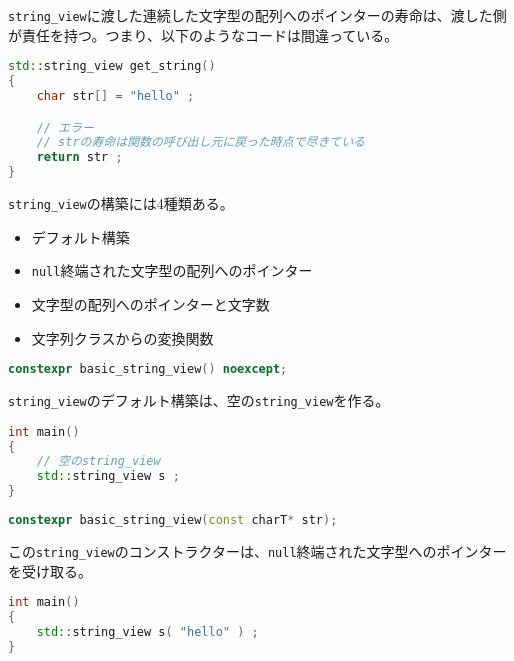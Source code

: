 \lstinline!string_view!に渡した連続した文字型の配列へのポインターの寿命は、渡した側が責任を持つ。つまり、以下のようなコードは間違っている。

\begin{lstlisting}[language=C++]
std::string_view get_string()
{
    char str[] = "hello" ;

    // エラー
    // strの寿命は関数の呼び出し元に戻った時点で尽きている
    return str ;
}
\end{lstlisting}

%

\lstinline!string_view!の構築には4種類ある。

\begin{itemize}
\itemsep1pt\parskip0pt
\item
  デフォルト構築
\item
  \lstinline!null!終端された文字型の配列へのポインター
\item
  文字型の配列へのポインターと文字数
\item
  文字列クラスからの変換関数
\end{itemize}

%

\bgroup
\begin{lstlisting}[language=C++]
constexpr basic_string_view() noexcept;
\end{lstlisting}
\egroup

\lstinline!string_view!のデフォルト構築は、空の\lstinline!string_view!を作る。

\begin{lstlisting}[language=C++]
int main()
{
    // 空のstring_view
    std::string_view s ;
}
\end{lstlisting}

%

\bgroup
\begin{lstlisting}[language=C++]
constexpr basic_string_view(const charT* str);
\end{lstlisting}
\egroup

この\lstinline!string_view!のコンストラクターは、\lstinline!null!終端された文字型へのポインターを受け取る。

\begin{lstlisting}[language=C++]
int main()
{
    std::string_view s( "hello" ) ;
}
\end{lstlisting}

